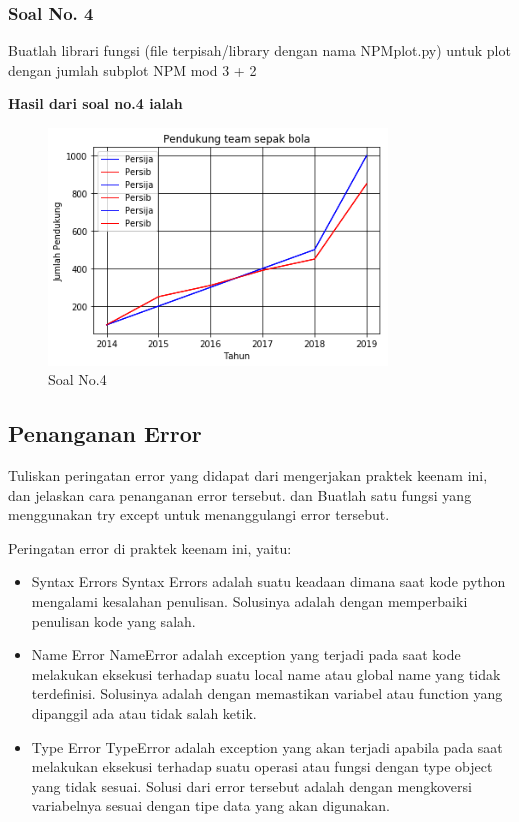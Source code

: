 \subsubsection{Soal No. 4}
\hfill \break
Buatlah librari fungsi (file terpisah/library dengan nama NPMplot.py) untuk plot dengan jumlah subplot NPM mod 3 + 2



\hfill \break
\textbf{Hasil dari soal no.4 ialah}

\begin{figure}[H]
	\includegraphics[width=9cm]{figures/6/1174021/p4.png}
	\centering
	\caption{Soal No.4 }
\end{figure}


\subsection{Penanganan Error}
Tuliskan  peringatan  error  yang  didapat  dari  mengerjakan  praktek  keenam  ini, dan  jelaskan  cara  penanganan  error  tersebut. dan  Buatlah  satu  fungsi  yang menggunakan try except untuk menanggulangi error tersebut.

\hfill \break
Peringatan error di praktek keenam ini, yaitu:
\begin{itemize}
	\item Syntax Errors
	Syntax Errors adalah suatu keadaan dimana saat kode python mengalami kesalahan penulisan. Solusinya adalah dengan memperbaiki penulisan kode yang salah.
	
	\item Name Error
	NameError adalah exception yang terjadi pada saat kode melakukan eksekusi terhadap suatu local name atau global name yang tidak terdefinisi. Solusinya adalah dengan memastikan variabel atau function yang dipanggil ada atau tidak salah ketik.
	
	\item Type Error
	TypeError adalah exception yang akan terjadi apabila pada saat melakukan eksekusi terhadap suatu operasi atau fungsi dengan type object yang tidak sesuai. Solusi dari error tersebut adalah dengan mengkoversi variabelnya sesuai dengan tipe data yang akan digunakan.
\end{itemize}


